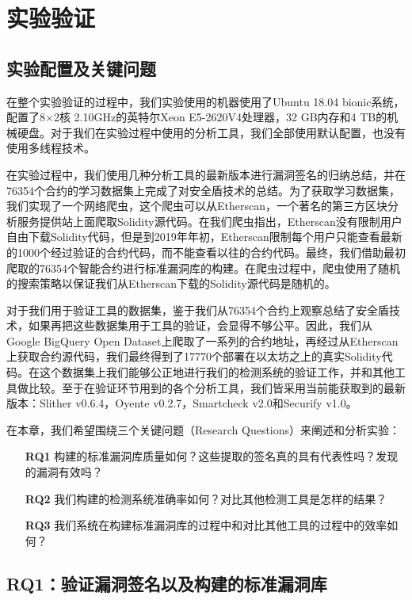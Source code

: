 \chapter{实验验证}

\section{实验配置及关键问题}

在整个实验验证的过程中，我们实验使用的机器使用了Ubuntu 18.04 bionic系统，配置了8$\times$2核 2.10GHz的英特尔Xeon E5-2620V4处理器，32 GB内存和4 TB的机械硬盘。对于我们在实验过程中使用的分析工具，我们全部使用默认配置，也没有使用多线程技术。

在实验过程中，我们使用几种分析工具的最新版本进行漏洞签名的归纳总结，并在76354个合约的学习数据集上完成了对安全盾技术的总结。为了获取学习数据集，我们实现了一个网络爬虫，这个爬虫可以从Etherscan，一个著名的第三方区块分析服务提供站上面爬取Solidity源代码。在我们爬虫指出，Etherscan没有限制用户自由下载Solidity代码，但是到2019年年初，Etherscan限制每个用户只能查看最新的1000个经过验证的合约代码，而不能查看以往的合约代码。最终，我们借助最初爬取的76354个智能合约进行标准漏洞库的构建。在爬虫过程中，爬虫使用了随机的搜索策略以保证我们从Etherscan下载的Solidity源代码是随机的。

对于我们用于验证工具的数据集，鉴于我们从76354个合约上观察总结了安全盾技术，如果再把这些数据集用于工具的验证，会显得不够公平。因此，我们从Google BigQuery Open Dataset上爬取了一系列的合约地址，再经过从Etherscan上获取合约源代码，我们最终得到了17770个部署在以太坊之上的真实Solidity代码。在这个数据集上我们能够公正地进行我们的检测系统的验证工作，并和其他工具做比较。至于在验证环节用到的各个分析工具，我们皆采用当前能获取到的最新版本：Slither v0.6.4，Oyente v0.2.7，Smartcheck v2.0和Securify v1.0。

在本章，我们希望围绕三个关键问题（Research Questions）来阐述和分析实验：
\begin{itemize}
  \item[\textbf{RQ1}] 构建的标准漏洞库质量如何？这些提取的签名真的具有代表性吗？发现的漏洞有效吗？
  \item[\textbf{RQ2}] 我们构建的检测系统准确率如何？对比其他检测工具是怎样的结果？
  \item[\textbf{RQ3}] 我们系统在构建标准漏洞库的过程中和对比其他工具的过程中的效率如何？
\end{itemize}

\section{RQ1：验证漏洞签名以及构建的标准漏洞库}

